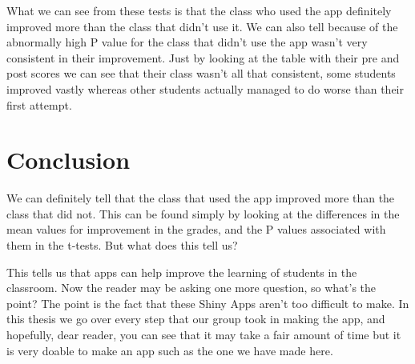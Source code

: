 \documentclass{article}\usepackage[]{graphicx}\usepackage[]{color}
\begin{document}
What we can see from these tests is that the class who used the app definitely improved more than the class that didn't use it. We can also tell because of the abnormally high P value for the class that didn't use the app wasn't very consistent in their improvement. Just by looking at the table with their pre and post scores we can see that their class wasn't all that consistent, some students improved vastly whereas other students actually managed to do worse than their first attempt. 














\section{Conclusion}

We can definitely tell that the class that used the app improved more than the class that did not. This can be found simply by looking at the differences in the mean values for improvement in the grades, and the P values associated with them in the t-tests. But what does this tell us?

This tells us that apps can help improve the learning of students in the classroom. Now the reader may be asking one more question, so what's the point? The point is the fact that these Shiny Apps aren't too difficult to make. In this thesis we go over every step that our group took in making the app, and hopefully, dear reader, you can see that it may take a fair amount of time but it is very doable to make an app such as the one we have made here. 
\end{document}
